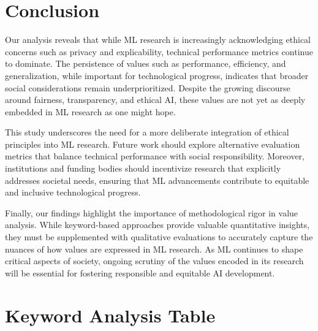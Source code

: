 \documentclass{article}
\begin{document}
\section{Conclusion}
Our analysis reveals that while ML research is increasingly acknowledging ethical concerns such as privacy and explicability, technical performance metrics continue to dominate. 
The persistence of values such as performance, efficiency, and generalization, while important for technological progress, indicates that broader social considerations remain underprioritized. 
Despite the growing discourse around fairness, transparency, and ethical AI, these values are not yet as deeply embedded in ML research as one might hope.

This study underscores the need for a more deliberate integration of ethical principles into ML research. Future work should explore alternative evaluation metrics that balance technical performance 
with social responsibility. Moreover, institutions and funding bodies should incentivize research that explicitly addresses societal needs, ensuring that ML advancements contribute to equitable and 
inclusive technological progress.

Finally, our findings highlight the importance of methodological rigor in value analysis. While keyword-based approaches provide valuable quantitative insights, they must be supplemented with 
qualitative evaluations to accurately capture the nuances of how values are expressed in ML research. As ML continues to shape critical aspects of society, ongoing scrutiny of the values encoded in its 
research will be essential for fostering responsible and equitable AI development.







\appendix

\section{Keyword Analysis Table}
\end{document}
